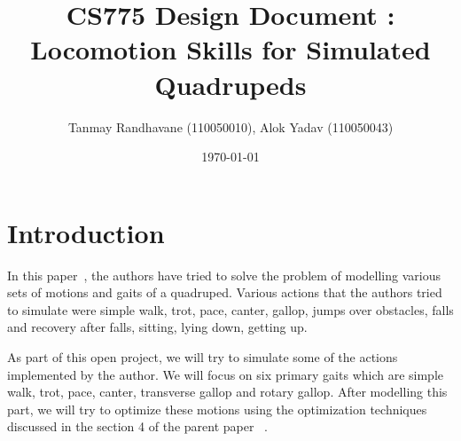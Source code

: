 \documentclass[a4paper,11pt,twocolumn]{article}
\title{CS775 Design Document : Locomotion Skills for Simulated Quadrupeds}
\author{Tanmay Randhavane (110050010), Alok Yadav (110050043)}
\date{\today}
\begin{document}
\maketitle

\section{Introduction}

In this paper~\cite{2011-TOG-quadruped}, the authors have tried to solve the problem of modelling various sets of motions and gaits of a quadruped. Various actions that the authors tried to simulate were simple walk, trot, pace, canter, gallop, jumps over obstacles, falls and recovery after falls, sitting, lying down, getting up.

As part of this open project, we will try to simulate some of the actions implemented by the author. We will focus on six primary gaits which are simple walk, trot, pace, canter, transverse gallop and rotary gallop. After modelling this part, we will try to optimize these motions using the optimization techniques discussed in the section 4 of the parent paper ~\cite{2011-TOG-quadruped}.
\end{document}
